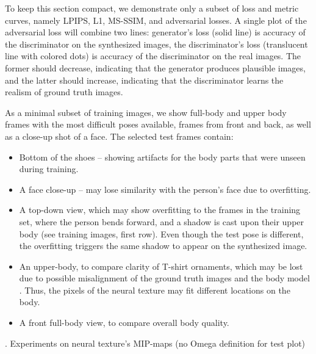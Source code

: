 To keep this section compact, we demonstrate only a subset of loss and metric curves, namely LPIPS, L1, MS-SSIM, and adversarial losses. A single plot of the adversarial loss will combine two lines: generator's loss (solid line) is accuracy of the discriminator on the synthesized images, the discriminator's loss (translucent line with colored dots) is accuracy of the discriminator on the real images. The former should decrease, indicating that the generator produces plausible images, and the latter should increase, indicating that the discriminator learns the realism of ground truth images.

As a minimal subset of training images, we show full-body and upper body frames with the most difficult poses available, frames from front and back, as well as a close-up shot of a face. The selected test frames contain:
\begin{itemize}
	\item Bottom of the shoes -- showing artifacts for the body parts that were unseen during training.
	\item A face close-up -- may lose similarity with the person's face due to overfitting.
	\item A top-down view, which may show overfitting to the frames in the training set, where the person bends forward, and a shadow is cast upon their upper body (see training images, first row). Even though the test pose is different, the overfitting triggers the same shadow to appear on the synthesized image.
	\item An upper-body, to compare clarity of T-shirt ornaments, which may be lost due to possible misalignment of the ground truth images and the body model \cite{dnn:smplx19}. Thus, the pixels of the neural texture may fit different locations on the body.
	\item A front full-body view, to compare overall body quality.
\end{itemize}

\setcounter{experiments-group}{1}

\clearpage
\newpage
{}. \alert{Experiments on neural texture's MIP-maps (no Omega definition for test plot)}

